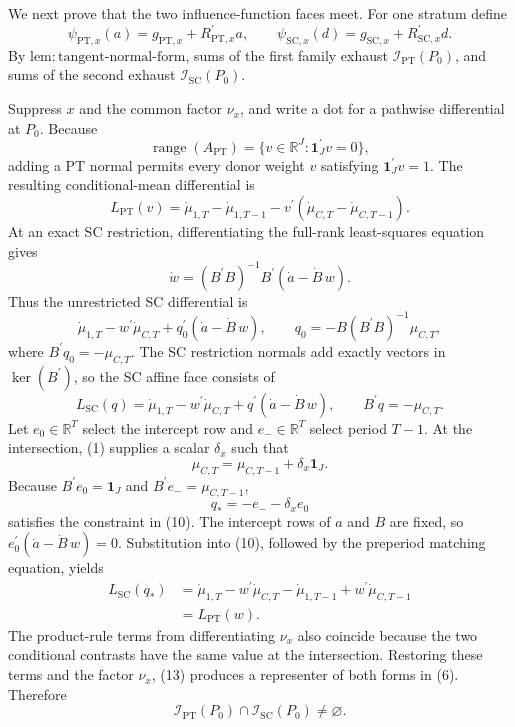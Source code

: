 We next prove that the two influence-function faces meet. For one stratum define
\[
 \psi_{\mathrm{PT},x}(a)=g_{\mathrm{PT},x}+R_{\mathrm{PT},x}^{\prime}a,
 \qquad
 \psi_{\mathrm{SC},x}(d)=g_{\mathrm{SC},x}+R_{\mathrm{SC},x}^{\prime}d.
 \tag{6}
\]
By \(\mathrm{lem{:}tangent\text{-}normal\text{-}form}\), sums of the first family exhaust \(\mathcal I_{\mathrm{PT}}(P_0)\), and sums of the second exhaust \(\mathcal I_{\mathrm{SC}}(P_0)\).

Suppress \(x\) and the common factor \(\nu_x\), and write a dot for a pathwise differential at \(P_0\). Because
\[
 \operatorname{range}(A_{\mathrm{PT}})
 =\{v\in\mathbb R^J:\mathbf 1_J^{\prime}v=0\},
\]
adding a PT normal permits every donor weight \(v\) satisfying \(\mathbf 1_J^{\prime}v=1\). The resulting conditional-mean differential is
\[
 L_{\mathrm{PT}}(v)
 =\dot\mu_{1,T}-\dot\mu_{1,T-1}
  -v^{\prime}(\dot\mu_{C,T}-\dot\mu_{C,T-1}).
 \tag{7}
\]
At an exact SC restriction, differentiating the full-rank least-squares equation gives
\[
 \dot w=(B^{\prime}B)^{-1}B^{\prime}(\dot a-\dot B\,w).
 \tag{8}
\]
Thus the unrestricted SC differential is
\[
 \dot\mu_{1,T}-w^{\prime}\dot\mu_{C,T}
 +q_0^{\prime}(\dot a-\dot B\,w),
 \qquad
 q_0=-B(B^{\prime}B)^{-1}\mu_{C,T},
 \tag{9}
\]
where \(B^{\prime}q_0=-\mu_{C,T}\). The SC restriction normals add exactly vectors in \(\ker(B^{\prime})\), so the SC affine face consists of
\[
 L_{\mathrm{SC}}(q)
 =\dot\mu_{1,T}-w^{\prime}\dot\mu_{C,T}
  +q^{\prime}(\dot a-\dot B\,w),
 \qquad
 B^{\prime}q=-\mu_{C,T}.
 \tag{10}
\]
Let \(e_0\in\mathbb R^T\) select the intercept row and \(e_-\in\mathbb R^T\) select period \(T-1\). At the intersection, (1) supplies a scalar \(\delta_x\) such that
\[
 \mu_{C,T}=\mu_{C,T-1}+\delta_x\mathbf 1_J.
 \tag{11}
\]
Because \(B^{\prime}e_0=\mathbf 1_J\) and \(B^{\prime}e_-=\mu_{C,T-1}\),
\[
 q_*=-e_- -\delta_xe_0
 \tag{12}
\]
satisfies the constraint in (10). The intercept rows of \(a\) and \(B\) are fixed, so \(e_0^{\prime}(\dot a-\dot B\,w)=0\). Substitution into (10), followed by the preperiod matching equation, yields
\[
 \begin{aligned}
 L_{\mathrm{SC}}(q_*)
 &=\dot\mu_{1,T}-w^{\prime}\dot\mu_{C,T}
   -\dot\mu_{1,T-1}+w^{\prime}\dot\mu_{C,T-1}\\
 &=L_{\mathrm{PT}}(w).
 \end{aligned}
 \tag{13}
\]
The product-rule terms from differentiating \(\nu_x\) also coincide because the two conditional contrasts have the same value at the intersection. Restoring these terms and the factor \(\nu_x\), (13) produces a representer of both forms in (6). Therefore
\[
 \mathcal I_{\mathrm{PT}}(P_0)\cap\mathcal I_{\mathrm{SC}}(P_0)\ne\varnothing.
 \tag{14}
\]


